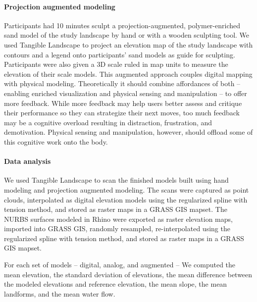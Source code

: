 \documentclass[prodmode,acmtochi]{acmsmall} %
\begin{document}
\paragraph{Projection augmented modeling}
Participants had 10 minutes sculpt
a projection-augmented, polymer-enriched sand model
of the study landscape by hand or with a wooden sculpting tool. 
%
We used Tangible Landscape to project 
an elevation map of the study landscape
with contours and a legend
onto participants' sand models as guide for sculpting. 
%
Participants were also given a 3D scale ruled in map units
to measure the elevation of their scale models. 
%
This augmented approach couples digital mapping with physical modeling.
%
Theoretically it should combine affordances of both -- 
enabling enriched visualization and physical sensing and manipulation -- 
to offer more feedback.
%
While more feedback may help users better assess and critique their performance 
so they can strategize their next moves,
too much feedback may be a cognitive overload 
resulting in distraction, frustration, and demotivation. 
%
Physical sensing and manipulation, however, should offload some of this cognitive work onto the body.

\paragraph{Data analysis}

We used Tangible Landscape to scan the finished models 
built using hand modeling and projection augmented modeling.
The scans were captured as point clouds, interpolated 
as digital elevation models using the regularized spline with tension method,
and stored as raster maps in a GRASS GIS mapset. 
%
The NURBS surfaces modeled in Rhino were exported as raster elevation maps,
imported into GRASS GIS, randomly resampled, 
re-interpolated using the regularized spline with tension method, 
and stored as raster maps in a GRASS GIS mapset. 

For each set of models -- digital, analog, and augmented -- 
We computed the mean elevation,
the standard deviation of elevations, 
the mean difference between the modeled elevations and reference elevation, 
the mean slope, 
the mean landforms, 
and the mean water flow. 


\end{document}
